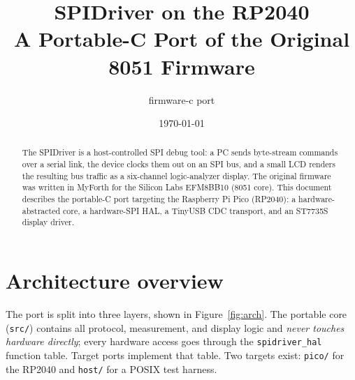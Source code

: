 \documentclass[11pt,a4paper]{article}
\title{\textbf{SPIDriver on the RP2040}\\[0.4em]
       \large A Portable-C Port of the Original 8051 Firmware}
\author{firmware-c port}
\date{\today}
\begin{document}
\maketitle

\begin{abstract}
The SPIDriver is a host-controlled SPI debug tool: a PC sends byte-stream
commands over a serial link, the device clocks them out on an SPI bus, and a
small LCD renders the resulting bus traffic as a six-channel logic-analyzer
display. The original firmware was written in MyForth for the Silicon Labs
EFM8BB10 (8051 core). This document describes the portable-C port targeting
the Raspberry Pi Pico (RP2040): a hardware-abstracted core, a hardware-SPI
HAL, a TinyUSB CDC transport, and an ST7735S display driver.
\end{abstract}

\tableofcontents

\section{Architecture overview}

The port is split into three layers, shown in Figure~\ref{fig:arch}. The
portable core (\texttt{src/}) contains all protocol, measurement, and display
logic and \emph{never touches hardware directly}; every hardware access goes
through the \texttt{spidriver\_hal} function table. Target ports implement
that table. Two targets exist: \texttt{pico/} for the RP2040 and
\texttt{host/} for a POSIX test harness.
\end{document}
